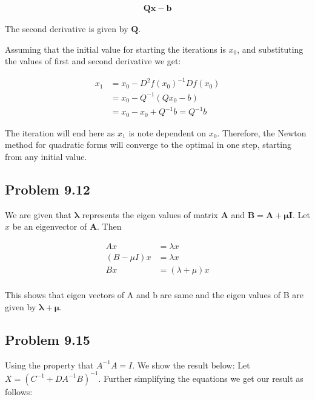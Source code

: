 \documentclass[letterpaper,12pt]{article}
\theoremstyle{definition}
\begin{document}
\begin{align*}
   \mathbf{Qx-b}
\end{align*}

\begin{flushleft}
The second derivative is given by $\mathbf{Q}$.

\vspace{2mm}

Assuming that the initial value for starting the iterations is $x_0$, and substituting the values of first and second derivative we get:
\end{flushleft}

\begin{align*}
x_1 &= x_0 - D^2f(x_0)^{-1}Df(x_0) \\
&= x_0 - Q^{-1} (Qx_0 - b) \\
&= x_0 - x_0 + Q^{-1}b = Q^{-1}b
\end{align*}


\begin{flushleft}
The iteration will end here as $x_1$ is note dependent on $x_0$. Therefore, the Newton method for quadratic forms will converge to the optimal in one step, starting from any initial value.
\end{flushleft}


\subsection*{Problem 9.12}

We are given that $\mathbf{\lambda}$ represents the eigen values of matrix $\mathbf{A}$ and $\mathbf{B = A+ \mathbf{\mu} I}$. Let $x$ be an eigenvector of $\mathbf{A}$. Then

\begin{align*}
 Ax &=\lambda x  \\
 (B - \mu I)x &= \lambda x  \\
 Bx &= (\lambda + \mu)x  \\
\end{align*}

\begin{flushleft}
This shows that eigen vectors of A and b are same and the eigen values of B are given by $\mathbf{\lambda + \mu}$.
\end{flushleft}
\subsection*{Problem 9.15}
\begin{flushleft}
Using the property that $A^{-1}A = I$. We show the result below:
\vspace{2mm}
Let $X = (C^{-1} + DA^{-1}B)^{-1}$. Further simplifying the equations we get our result as follows: 
\end{flushleft}
\end{document}

